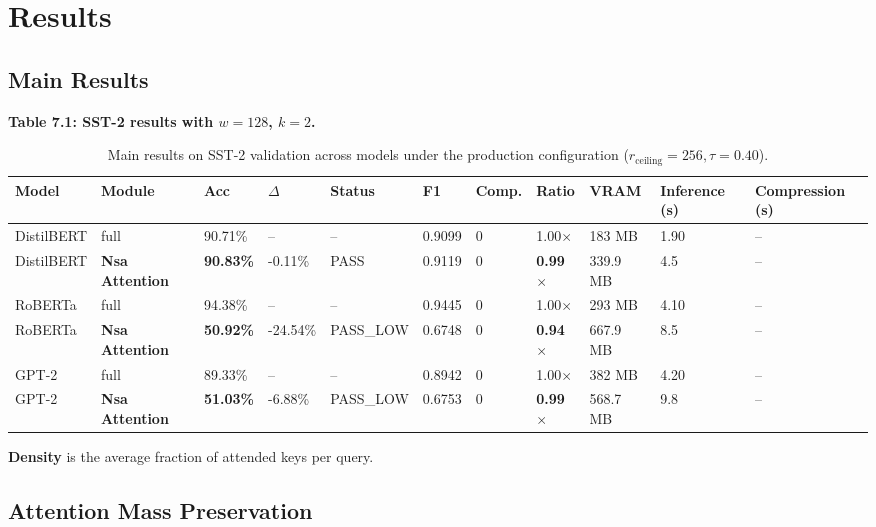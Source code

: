 
\section{Results}

\subsection{Main Results}

\textbf{Table 7.1: SST-2 results with $w = 128$, $k = 2$.}

\begin{table}[t]
\centering
\small
\begin{tabular}{lllllllllll}
\toprule
\textbf{Model} & \textbf{Module} & \textbf{Acc} & \textbf{$\Delta$} & \textbf{Status} & \textbf{F1} & \textbf{Comp.} & \textbf{Ratio} & \textbf{VRAM} & \textbf{Inference (s)} & \textbf{Compression (s)} \\
\midrule
DistilBERT & full & 90.71\% & -- & -- & 0.9099 & 0 & 1.00$\times$ & 183 MB & 1.90 & -- \\
DistilBERT & \textbf{Nsa Attention} & \textbf{90.83\%} & -0.11\% & PASS & 0.9119 & 0 & \textbf{0.99$\times$} & 339.9 MB & 4.5 & -- \\
RoBERTa & full & 94.38\% & -- & -- & 0.9445 & 0 & 1.00$\times$ & 293 MB & 4.10 & -- \\
RoBERTa & \textbf{Nsa Attention} & \textbf{50.92\%} & -24.54\% & PASS\_LOW & 0.6748 & 0 & \textbf{0.94$\times$} & 667.9 MB & 8.5 & -- \\
GPT-2 & full & 89.33\% & -- & -- & 0.8942 & 0 & 1.00$\times$ & 382 MB & 4.20 & -- \\
GPT-2 & \textbf{Nsa Attention} & \textbf{51.03\%} & -6.88\% & PASS\_LOW & 0.6753 & 0 & \textbf{0.99$\times$} & 568.7 MB & 9.8 & -- \\
\bottomrule
\end{tabular}
\caption{Main results on SST-2 validation across models under the production configuration ($r_{\mathrm{ceiling}}=256, \tau=0.40$).}
\label{tab:main_sst2}
\end{table}

\textbf{Density} is the average fraction of attended keys per query.

\subsection{Attention Mass Preservation}

